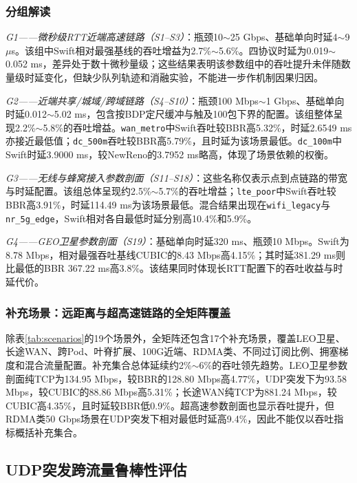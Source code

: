 \documentclass[10pt,twocolumn]{article}
\begin{document}
\subsubsection{分组解读}

\textit{G1——微秒级RTT近端高速链路（S1--S3）}：瓶颈10$\sim$25 Gbps、基础单向时延4$\sim$9 $\mu$s。该组中Swift相对最强基线的吞吐增益为2.7\%$\sim$5.6\%。四协议时延为0.019$\sim$0.052 ms，差异处于数十微秒量级；这些结果表明该参数组中的吞吐提升未伴随数量级时延变化，但缺少队列轨迹和消融实验，不能进一步作机制因果归因。

\textit{G2——近端共享/城域/跨域链路（S4--S10）}：瓶颈100 Mbps$\sim$1 Gbps、基础单向时延0.012$\sim$5.02 ms，包含按BDP定尺缓冲与触及100包下界的配置。该组整体呈现2.2\%$\sim$5.8\%的吞吐增益。\texttt{wan\_metro}中Swift吞吐较BBR高5.32\%，时延2.6549 ms亦接近最低值；\texttt{dc\_500m}吞吐较BBR高5.79\%，且时延为该场景最低。\texttt{dc\_100m}中Swift时延3.9000 ms，较NewReno的3.7952 ms略高，体现了场景依赖的权衡。

\textit{G3——无线与蜂窝接入参数剖面（S11--S18）}：这些名称仅表示点到点链路的带宽与时延配置。该组总体呈现约2.5\%$\sim$5.7\%的吞吐增益；\texttt{lte\_poor}中Swift吞吐较BBR高3.91\%，时延114.49 ms为该场景最低。混合结果出现在\texttt{wifi\_legacy}与\texttt{nr\_5g\_edge}，Swift相对各自最低时延分别高10.4\%和5.9\%。

\textit{G4——GEO卫星参数剖面（S19）}：基础单向时延320 ms、瓶颈10 Mbps。Swift为8.78 Mbps，相对最强吞吐基线CUBIC的8.43 Mbps高4.15\%；其时延381.29 ms则比最低的BBR 367.22 ms高3.8\%。该结果同时体现长RTT配置下的吞吐收益与时延代价。

\subsubsection{补充场景：远距离与超高速链路的全矩阵覆盖}
\label{subsubsec:extended}

除表\ref{tab:scenarios}的19个场景外，全矩阵还包含17个补充场景，覆盖LEO卫星、长途WAN、跨Pod、叶脊扩展、100G近端、RDMA类、不同过订阅比例、拥塞梯度和混合流量配置。补充集合总体延续约2\%$\sim$6\%的吞吐领先趋势。LEO卫星参数剖面纯TCP为134.95 Mbps，较BBR的128.80 Mbps高4.77\%，UDP突发下为93.58 Mbps，较CUBIC的88.86 Mbps高5.31\%；长途WAN纯TCP为881.24 Mbps，较CUBIC高4.35\%，且时延较BBR低0.9\%。超高速参数剖面也显示吞吐提升，但RDMA类50 Gbps场景在UDP突发下相对最低时延高9.4\%，因此不能仅以吞吐指标概括补充集合。

\subsection{UDP突发跨流量鲁棒性评估}
\label{subsec:udp-burst}
\end{document}
